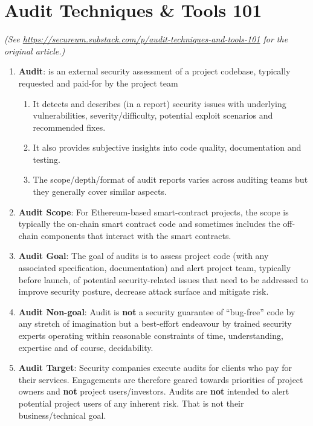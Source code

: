 \section{Audit Techniques \& Tools 101}

\textit{(See \url{https://secureum.substack.com/p/audit-techniques-and-tools-101} for the original article.)}\\

\begin{enumerate}
\item\textbf{Audit}: is an external security assessment of a project codebase, typically requested and paid-for by the project team
	\begin{enumerate}
	\item It detects and describes (in a report) security issues with underlying vulnerabilities, severity/difficulty, potential exploit scenarios and recommended fixes.
	\item It also provides subjective insights into code quality, documentation and testing.
	\item The scope/depth/format of audit reports varies across auditing teams but they generally cover similar aspects.
	\end{enumerate}

\item\textbf{Audit Scope}: For Ethereum-based smart-contract projects, the scope is typically the on-chain smart contract code and sometimes includes the off-chain components that interact with the smart contracts.

\item\textbf{Audit Goal}: The goal of audits is to assess project code (with any associated specification, documentation) and alert project team, typically before launch, of potential security-related issues that need to be addressed to improve security posture, decrease attack surface and mitigate risk.

\item\textbf{Audit Non-goal}: Audit is \textbf{not} a security guarantee of “bug-free” code by any stretch of imagination but a best-effort endeavour by trained security experts operating within reasonable constraints of time, understanding, expertise and of course, decidability.

\item\textbf{Audit Target}: Security companies execute audits for clients who pay for their services. Engagements are therefore geared towards priorities of project owners and \textbf{not} project users/investors. Audits are \textbf{not} intended to alert potential project users of any inherent risk. That is not their business/technical goal.


\end{enumerate}
